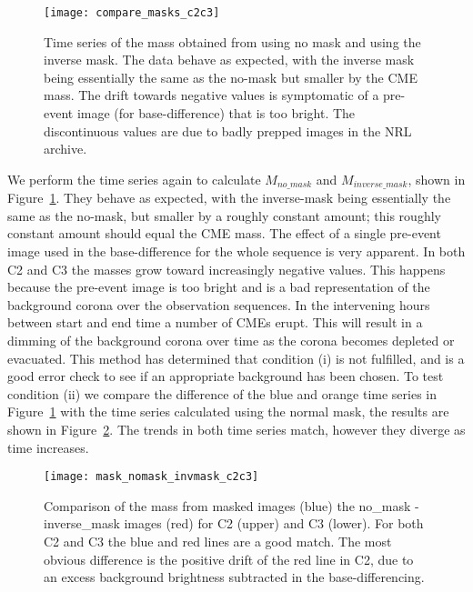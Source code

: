 \begin{figure}[t!]
\begin{center}
\texttt{[image: compare\_masks\_c2c3]}
\caption{Time series of the mass obtained from using no mask and using the inverse mask. The data behave as expected, with the inverse mask being essentially the same as the no-mask but smaller by the CME mass. The drift towards negative values is symptomatic of a pre-event image (for base-difference) that is too bright. The discontinuous values are due to badly prepped images in the NRL archive.}
\label{fig:inverse_masks}
\end{center}
\end{figure}
We perform the time series again to calculate $M_{no\_mask}$ and $M_{inverse\_mask}$, shown in Figure~\ref{fig:inverse_masks}. They behave as expected, with the inverse-mask being essentially the same as the no-mask, but smaller by a roughly constant amount; this roughly constant amount should equal the CME mass. The effect of a single pre-event image used in the base-difference for the whole sequence is very apparent. In both C2 and C3 the masses grow toward increasingly negative values. This happens because the pre-event image is too bright and is a bad representation of the background corona over the observation sequences. In the intervening hours between start and end time a number of CMEs erupt. This will result in a dimming of the background corona over time as the corona becomes depleted or evacuated. This method has determined that condition (i) is not fulfilled, and is a good error check to see if an appropriate background has been chosen. To test condition (ii) we compare the difference of the blue and orange time series in Figure~\ref{fig:inverse_masks} with the time series calculated using the normal mask, the results are shown in Figure~\ref{fig:comparison}. The trends in both time series match, however they diverge as time increases. 
\begin{figure}[t!]
\begin{center}
\texttt{[image: mask\_nomask\_invmask\_c2c3]}
\caption{Comparison of the mass from masked images (blue) the no\_mask - inverse\_mask images (red) for C2 (upper) and C3 (lower). For both C2 and C3 the blue and red lines are a good match. The most obvious difference is the positive drift of the red line in C2, due to an excess background brightness subtracted in the base-differencing.}
\label{fig:comparison}
\end{center}
\end{figure}
